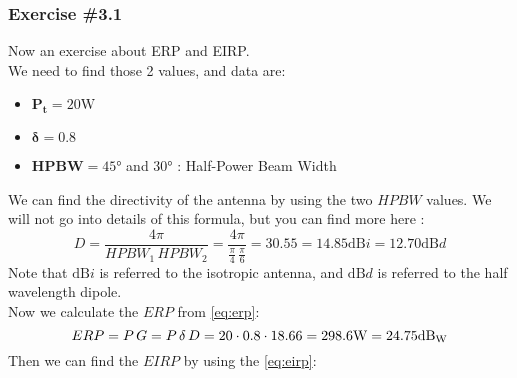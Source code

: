 \subsubsection*{Exercise \#3.1}
Now an exercise about ERP and EIRP.\\
We need to find those 2 values, and data are:
\begin{itemize}
    \item $\bm{P_t}=20\si{\watt}$
    \item $\bm{\delta}=0.8$
    \item $\bm{HPBW}=45\si{\degree}$ and $30\si{\degree}$ : Half-Power Beam Width
\end{itemize}
We can find the directivity of the antenna by using the two $HPBW$ values. We will not go into details of this formula, but you can find more here\cite{Valparaiso_hpbw} :
\begin{equation*}
    D=\frac{4\pi}{HPBW_1\,HPBW_2}=\frac{4\pi}{\frac{\pi}{4}\,\frac{\pi}{6}}=30.55=14.85\si{\deci\bel i}=12.70 \si{\deci\bel d}
\end{equation*}
Note that $\si{\deci\bel i}$ is referred to the isotropic antenna, and $\si{\deci\bel d}$ is referred to the half wavelength dipole.\\
Now we calculate the $ERP$ from \cref{eq:erp}:
\begin{equation*}
    ERP=P\,G=P\,\delta\,D=20\cdot 0.8\cdot 18.66=298.6\si{\watt}=24.75\si{\deci\bel_{\watt}}
\end{equation*}
Then we can find the $EIRP$ by using the \cref{eq:eirp}: